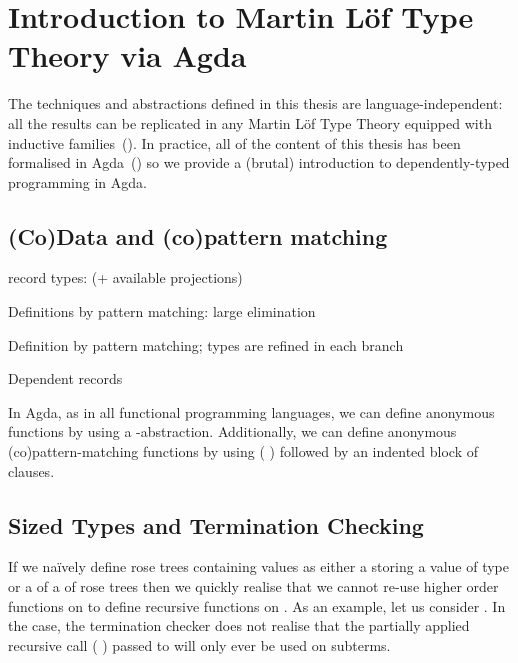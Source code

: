 \chapter{Introduction to Martin L\"of Type Theory via Agda}

The techniques and abstractions defined in this thesis are language-independent: all the
results can be replicated in any Martin L\"of Type Theory equipped with inductive
families~(\cite{dybjer1994inductive}). In practice, all of the content of this thesis
has been formalised in Agda~(\cite{norell2009dependently}) so we provide a (brutal)
introduction to dependently-typed programming in Agda.

\section{(Co)Data and (co)pattern matching}


record types: (+ available projections)


Definitions by pattern matching: large elimination



Definition by pattern matching; types are refined in each branch


Dependent records


In Agda, as in all functional programming languages, we can define anonymous functions
by using a -abstraction. Additionally, we can define anonymous (co)pattern-matching
functions by using ( ) followed by an indented block of clauses.



\section{Sized Types and Termination Checking}

If we naïvely define rose trees containing  values as either a  storing
a value of type  or a  of a  of rose trees then we quickly
realise that we cannot re-use higher order functions on  to define recursive
functions on . As an example, let us consider .
In the  case, the termination checker does not realise that the partially
applied recursive call ( ) passed to
 will only ever be used on subterms.

